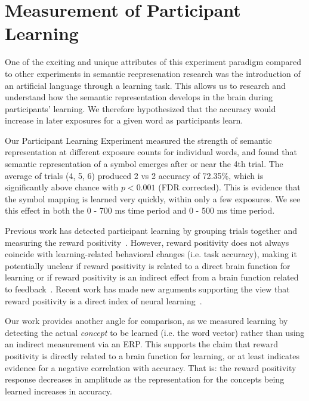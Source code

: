 \section{Measurement of Participant Learning}
\label{sec:discussion:participantlearning}

One of the exciting and unique attributes of this experiment paradigm compared 
to other experiments in semantic reepresenation research was the introduction 
of an artificial language through a learning task. This allows us to research 
and understand how the semantic representation develops in the brain during 
participants' learning. We therefore hypothesized that the \tvt accuracy would 
increase in later exposures for a given word as participants learn.

Our Participant Learning Experiment measured the strength of semantic 
representation at different exposure counts for individual words, and found 
that semantic representation of a symbol emerges after or near the 4th trial.  
The average of trials (4, 5, 6) produced 2 vs 2 accuracy of 72.35\%, which is 
significantly above chance with $p < 0.001$ (FDR corrected). This is evidence 
that the symbol mapping is learned very quickly, within only a few exposures.  
We see this effect in both the 0 - 700 ms time period and 0 - 500 ms time 
period.

Previous work has detected participant learning by grouping trials together and 
measuring the reward positivity~\cite{krigolson2014we}. However, reward 
positivity does not always coincide with learning-related behavioral changes 
(i.e. task accuracy), making it potentially unclear if reward positivity is 
related to a direct brain function for learning or if reward positivity is an 
indirect effect from a brain function related to 
feedback~\cite{walsh2012learning}. Recent work has made new arguments 
supporting the view that reward positivity is a direct index of neural 
learning~\cite{williams2017application}. 

Our work provides another angle for comparison, as we measured learning by 
detecting the actual \emph{concept} to be learned (i.e. the word vector) rather 
than using an indirect measurement via an ERP. This supports the claim that 
reward positivity is directly related to a brain function for learning, or at 
least indicates evidence for a negative correlation with \tvt accuracy. That 
is: the reward positivity response decreases in amplitude as the representation 
for the concepts being learned increases in \tvt accuracy.

